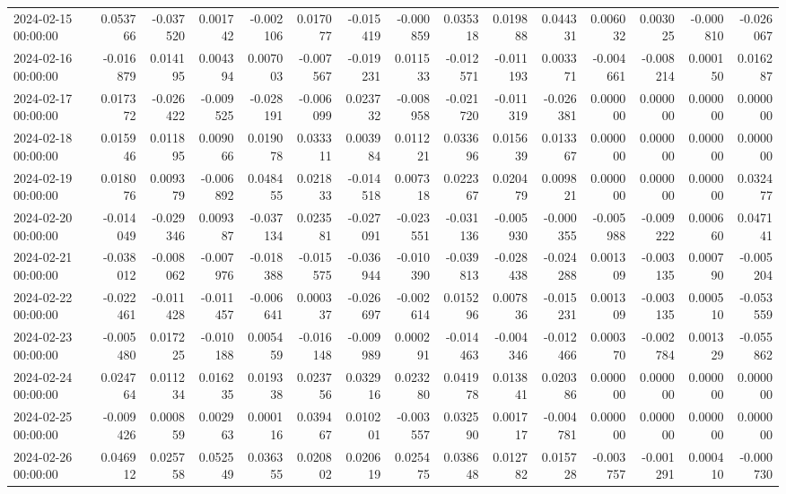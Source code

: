 \begin{tabular}{lrrrrrrrrrrrrrr}
2024-02-15 00:00:00 & 0.053766 & -0.037520 & 0.001742 & -0.002106 & 0.017077 & -0.015419 & -0.000859 & 0.035318 & 0.019888 & 0.044331 & 0.006032 & 0.003025 & -0.000810 & -0.026067 \\
2024-02-16 00:00:00 & -0.016879 & 0.014195 & 0.004394 & 0.007003 & -0.007567 & -0.019231 & 0.011533 & -0.012571 & -0.011193 & 0.003371 & -0.004661 & -0.008214 & 0.000150 & 0.016287 \\
2024-02-17 00:00:00 & 0.017372 & -0.026422 & -0.009525 & -0.028191 & -0.006099 & 0.023732 & -0.008958 & -0.021720 & -0.011319 & -0.026381 & 0.000000 & 0.000000 & 0.000000 & 0.000000 \\
2024-02-18 00:00:00 & 0.015946 & 0.011895 & 0.009066 & 0.019078 & 0.033311 & 0.003984 & 0.011221 & 0.033696 & 0.015639 & 0.013367 & 0.000000 & 0.000000 & 0.000000 & 0.000000 \\
2024-02-19 00:00:00 & 0.018076 & 0.009379 & -0.006892 & 0.048455 & 0.021833 & -0.014518 & 0.007318 & 0.022367 & 0.020479 & 0.009821 & 0.000000 & 0.000000 & 0.000000 & 0.032477 \\
2024-02-20 00:00:00 & -0.014049 & -0.029346 & 0.009387 & -0.037134 & 0.023581 & -0.027091 & -0.023551 & -0.031136 & -0.005930 & -0.000355 & -0.005988 & -0.009222 & 0.000660 & 0.047141 \\
2024-02-21 00:00:00 & -0.038012 & -0.008062 & -0.007976 & -0.018388 & -0.015575 & -0.036944 & -0.010390 & -0.039813 & -0.028438 & -0.024288 & 0.001309 & -0.003135 & 0.000790 & -0.005204 \\
2024-02-22 00:00:00 & -0.022461 & -0.011428 & -0.011457 & -0.006641 & 0.000337 & -0.026697 & -0.002614 & 0.015296 & 0.007836 & -0.015231 & 0.001309 & -0.003135 & 0.000510 & -0.053559 \\
2024-02-23 00:00:00 & -0.005480 & 0.017225 & -0.010188 & 0.005459 & -0.016148 & -0.009989 & 0.000291 & -0.014463 & -0.004346 & -0.012466 & 0.000370 & -0.002784 & 0.001329 & -0.055862 \\
2024-02-24 00:00:00 & 0.024764 & 0.011234 & 0.016235 & 0.019338 & 0.023756 & 0.032916 & 0.023280 & 0.041978 & 0.013841 & 0.020386 & 0.000000 & 0.000000 & 0.000000 & 0.000000 \\
2024-02-25 00:00:00 & -0.009426 & 0.000859 & 0.002963 & 0.000116 & 0.039467 & 0.010201 & -0.003557 & 0.032590 & 0.001717 & -0.004781 & 0.000000 & 0.000000 & 0.000000 & 0.000000 \\
2024-02-26 00:00:00 & 0.046912 & 0.025758 & 0.052549 & 0.036355 & 0.020802 & 0.020619 & 0.025475 & 0.038648 & 0.012782 & 0.015728 & -0.003757 & -0.001291 & 0.000410 & -0.000730 \\

\end{tabular}
